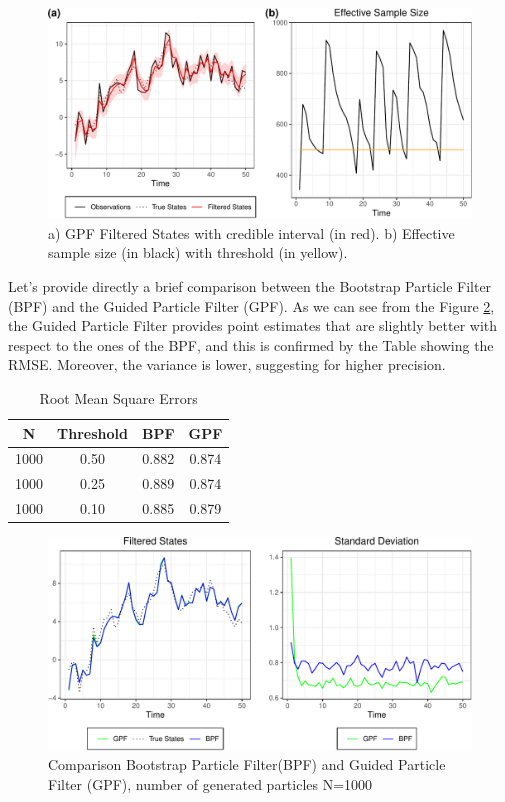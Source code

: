 \documentclass[
]{book}
\theoremstyle{break}
\theoremstyle{nonumberplain}
\begin{document}
\begin{figure}[H]

{\centering \includegraphics{prova_knit_finale_files/figure-latex/unnamed-chunk-15-1} 

}

\caption{a) GPF Filtered States with credible interval (in red). b) Effective sample size (in black) with threshold (in yellow).}\label{fig:unnamed-chunk-15}
\end{figure}

Let's provide directly a brief comparison between the Bootstrap Particle
Filter (BPF) and the Guided Particle Filter (GPF). As we can see from
the Figure \ref{fig:myfig5}, the Guided Particle Filter provides point
estimates that are slightly better with respect to the ones of the BPF,
and this is confirmed by the Table showing the RMSE. Moreover, the
variance is lower, suggesting for higher precision.

\begin{longtable}[t]{cccc}
\caption{\label{tab:unnamed-chunk-17}Root Mean Square Errors}\\
\toprule
N & Threshold & BPF & GPF\\
\midrule
1000 & 0.50 & 0.882 & 0.874\\
1000 & 0.25 & 0.889 & 0.874\\
1000 & 0.10 & 0.885 & 0.879\\
\bottomrule
\end{longtable}

\begin{figure}[H]

{\centering \includegraphics{prova_knit_finale_files/figure-latex/myfig5-1} 

}

\caption{Comparison Bootstrap Particle Filter(BPF) and Guided Particle Filter (GPF), number of generated particles N=1000}\label{fig:myfig5}
\end{figure}
\end{document}
